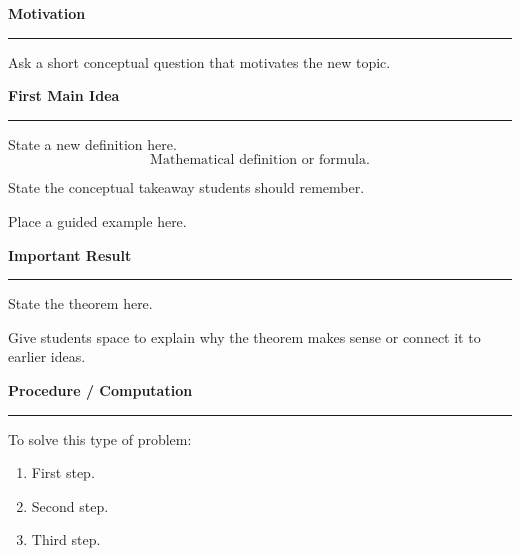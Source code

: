 \documentclass[12pt]{article}
\newcommand{\sectiontitle}[1]{
  \vspace{0.1in}
  {\large\textbf{#1}}
  \vspace{0.05in}\hrule\vspace{0.1in}
}
\begin{document}

\sectiontitle{Motivation}

\begin{thinkbox}
Ask a short conceptual question that motivates the new topic.

\vspace{0.45in}
\end{thinkbox}

\sectiontitle{First Main Idea}

\begin{definitionbox}
State a new definition here.
\[
\text{Mathematical definition or formula.}
\]
\end{definitionbox}

\begin{bigideabox}
State the conceptual takeaway students should remember.
\end{bigideabox}

\begin{examplebox}
Place a guided example here.

\vspace{1.0in}
\end{examplebox}

\sectiontitle{Important Result}

\begin{theorembox}
State the theorem here.
\end{theorembox}

\begin{thinkbox}[Why?]
Give students space to explain why the theorem makes sense or connect it to earlier ideas.

\vspace{0.65in}
\end{thinkbox}

\sectiontitle{Procedure / Computation}

\begin{strategybox}
To solve this type of problem:
\begin{enumerate}
  \item First step.
  \item Second step.
  \item Third step.
\end{enumerate}
\end{strategybox}
\end{document}
